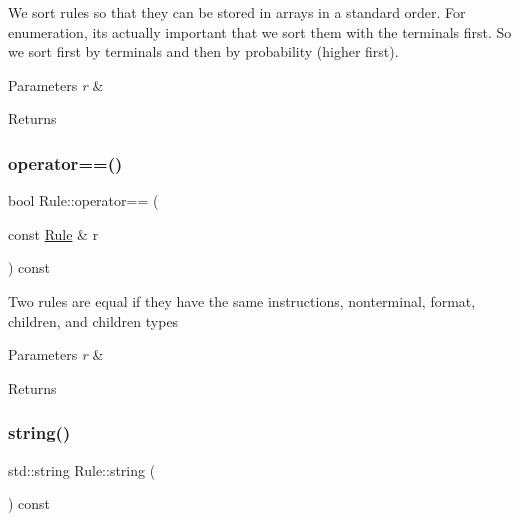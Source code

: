 We sort rules so that they can be stored in arrays in a standard order. For enumeration, it\textquotesingle{}s actually important that we sort them with the terminals first. So we sort first by terminals and then by probability (higher first). 
\begin{DoxyParams}{Parameters}
{\em r} & \\
\hline
\end{DoxyParams}
\begin{DoxyReturn}{Returns}

\end{DoxyReturn}
\mbox{\label{class_rule_a183fafc8a6b43515436a1de8f63ec98d}} 
\subsubsection{\texorpdfstring{operator==()}{operator==()}}
{\footnotesize\ttfamily bool Rule\+::operator== (\begin{DoxyParamCaption}\item[{const \hyperlink{class_rule}{Rule} \&}]{r }\end{DoxyParamCaption}) const\hspace{0.3cm}{\ttfamily [inline]}}

Two rules are equal if they have the same instructions, nonterminal, format, children, and children types 
\begin{DoxyParams}{Parameters}
{\em r} & \\
\hline
\end{DoxyParams}
\begin{DoxyReturn}{Returns}

\end{DoxyReturn}
\mbox{\label{class_rule_a7f16256eabd7bd8b94fbcf857bf1e45b}} 
\subsubsection{\texorpdfstring{string()}{string()}}
{\footnotesize\ttfamily std\+::string Rule\+::string (\begin{DoxyParamCaption}{ }\end{DoxyParamCaption}) const\hspace{0.3cm}{\ttfamily [inline]}}

\mbox{\label{class_rule_a97db8e22bb8445b92779eb165bb29ae5}} 
